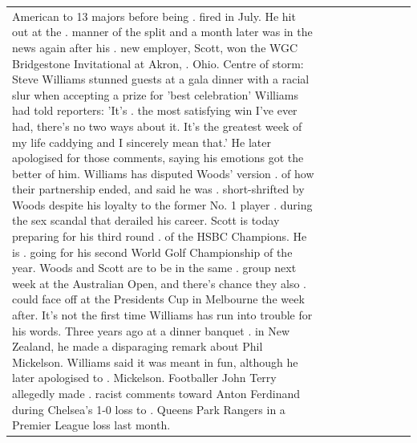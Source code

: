 \begin{table}[H]
\begin{tabular}{lllrlllll}
American to 13 majors before being . fired in July. He hit out at the . manner of the split and a month later was in the news again after his . new employer, Scott, won the WGC Bridgestone Invitational at Akron, . Ohio. Centre of storm: Steve Williams stunned guests at a gala dinner with a racial slur when accepting a prize for 'best celebration' Williams had told reporters: 'It's . the most satisfying win I've ever had, there's no two ways about it. It's the greatest week of my life caddying and I sincerely mean that.' He later apologised for those comments, saying his emotions got the better of him. Williams has disputed Woods' version . of how their partnership ended, and said he was . short-shrifted by Woods despite his loyalty to the former No. 1 player . during the sex scandal that derailed his career. Scott is today preparing for his third round . of the HSBC Champions. He is . going for his second World Golf Championship of the year. Woods and Scott are to be in the same . group next week at the Australian Open, and there's chance they also . could face off at the Presidents Cup in Melbourne the week after. It's not the first time Williams has run into trouble for his words. Three years ago at a dinner banquet . in New Zealand, he made a disparaging remark about Phil Mickelson. Williams said it was meant in fun, although he later apologised to . Mickelson. Footballer John Terry allegedly made . racist comments toward Anton Ferdinand during Chelsea's 1-0 loss to . Queens Park Rangers in a Premier League loss last month.


\end{tabular}
\end{table}
